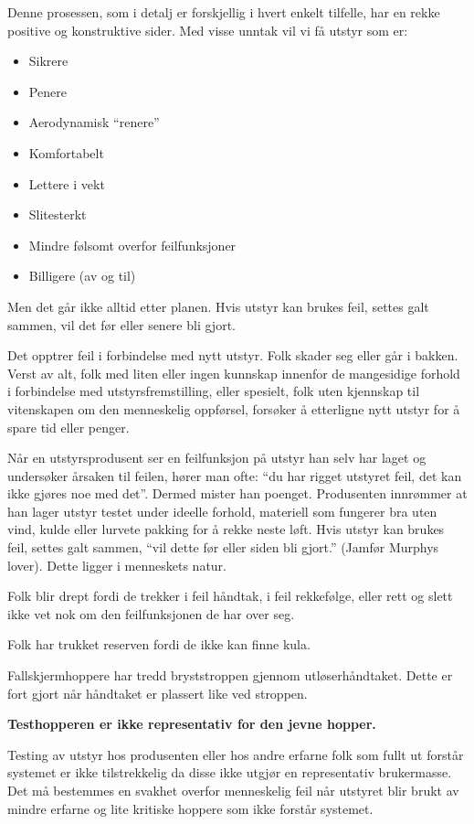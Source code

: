 Denne prosessen, som i detalj er forskjellig i hvert enkelt tilfelle, har en rekke positive og konstruktive sider. Med visse unntak vil vi få utstyr som er:
\begin{itemize}
	\item Sikrere
	\item Penere
	\item Aerodynamisk ``renere''
	\item Komfortabelt
	\item Lettere i vekt
	\item Slitesterkt
	\item Mindre følsomt overfor feilfunksjoner
	\item Billigere (av og til)
\end{itemize}

Men det går ikke alltid etter planen. Hvis utstyr kan brukes feil, settes galt sammen, vil det før eller senere bli gjort.

Det opptrer feil i forbindelse med nytt utstyr. Folk skader seg eller går i bakken. Verst av alt, folk med liten eller ingen kunnskap innenfor de mangesidige forhold i forbindelse med utstyrsfremstilling, eller spesielt, folk uten kjennskap til vitenskapen om den menneskelig oppførsel, forsøker å etterligne nytt utstyr for å spare tid eller penger.

Når en utstyrsprodusent ser en feilfunksjon på utstyr han selv har laget og undersøker årsaken til feilen, hører man ofte: ``du har rigget utstyret feil, det kan ikke gjøres noe med det''. Dermed mister han poenget. Produsenten innrømmer at han lager utstyr testet under ideelle forhold, materiell som fungerer bra uten vind, kulde eller lurvete pakking for å rekke neste løft. Hvis utstyr kan brukes feil, settes galt sammen, ``vil dette før eller siden bli gjort.'' (Jamfør Murphys lover). Dette ligger i menneskets natur.

Folk blir drept fordi de trekker i feil håndtak, i feil rekkefølge, eller rett og slett ikke vet nok om den feilfunksjonen de har over seg.

Folk har trukket reserven fordi de ikke kan finne kula.

Fallskjermhoppere har tredd bryststroppen gjennom utløserhåndtaket. Dette er fort gjort når håndtaket er plassert like ved stroppen.

\textbf{Testhopperen er ikke representativ for den jevne hopper.}

Testing av utstyr hos produsenten eller hos andre erfarne folk som fullt ut forstår systemet er ikke tilstrekkelig da disse ikke utgjør en representativ brukermasse. Det må bestemmes en svakhet overfor menneskelig feil når utstyret blir brukt av mindre erfarne og lite kritiske hoppere som ikke forstår systemet.

